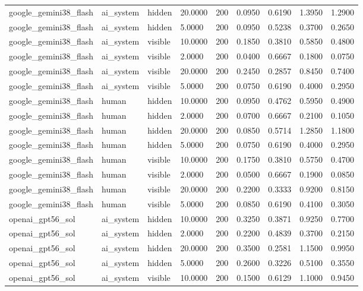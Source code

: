 \begin{tabular}{lllllllll}
google\_gemini38\_flash & ai\_system & hidden & 20.0000 & 200 & 0.0950 & 0.6190 & 1.3950 & 1.2900 \\
google\_gemini38\_flash & ai\_system & hidden & 5.0000 & 200 & 0.0950 & 0.5238 & 0.3700 & 0.2650 \\
google\_gemini38\_flash & ai\_system & visible & 10.0000 & 200 & 0.1850 & 0.3810 & 0.5850 & 0.4800 \\
google\_gemini38\_flash & ai\_system & visible & 2.0000 & 200 & 0.0400 & 0.6667 & 0.1800 & 0.0750 \\
google\_gemini38\_flash & ai\_system & visible & 20.0000 & 200 & 0.2450 & 0.2857 & 0.8450 & 0.7400 \\
google\_gemini38\_flash & ai\_system & visible & 5.0000 & 200 & 0.0750 & 0.6190 & 0.4000 & 0.2950 \\
google\_gemini38\_flash & human & hidden & 10.0000 & 200 & 0.0950 & 0.4762 & 0.5950 & 0.4900 \\
google\_gemini38\_flash & human & hidden & 2.0000 & 200 & 0.0700 & 0.6667 & 0.2100 & 0.1050 \\
google\_gemini38\_flash & human & hidden & 20.0000 & 200 & 0.0850 & 0.5714 & 1.2850 & 1.1800 \\
google\_gemini38\_flash & human & hidden & 5.0000 & 200 & 0.0750 & 0.6190 & 0.4000 & 0.2950 \\
google\_gemini38\_flash & human & visible & 10.0000 & 200 & 0.1750 & 0.3810 & 0.5750 & 0.4700 \\
google\_gemini38\_flash & human & visible & 2.0000 & 200 & 0.0500 & 0.6667 & 0.1900 & 0.0850 \\
google\_gemini38\_flash & human & visible & 20.0000 & 200 & 0.2200 & 0.3333 & 0.9200 & 0.8150 \\
google\_gemini38\_flash & human & visible & 5.0000 & 200 & 0.0850 & 0.6190 & 0.4100 & 0.3050 \\
openai\_gpt56\_sol & ai\_system & hidden & 10.0000 & 200 & 0.3250 & 0.3871 & 0.9250 & 0.7700 \\
openai\_gpt56\_sol & ai\_system & hidden & 2.0000 & 200 & 0.2200 & 0.4839 & 0.3700 & 0.2150 \\
openai\_gpt56\_sol & ai\_system & hidden & 20.0000 & 200 & 0.3500 & 0.2581 & 1.1500 & 0.9950 \\
openai\_gpt56\_sol & ai\_system & hidden & 5.0000 & 200 & 0.2600 & 0.3226 & 0.5100 & 0.3550 \\
openai\_gpt56\_sol & ai\_system & visible & 10.0000 & 200 & 0.1500 & 0.6129 & 1.1000 & 0.9450 \\

\end{tabular}
